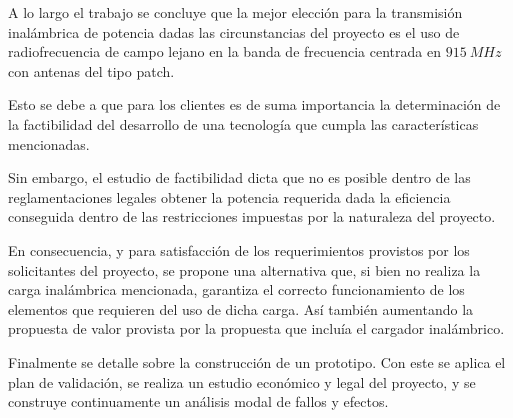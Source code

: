 A lo largo el trabajo se concluye que la mejor elección para la transmisión inalámbrica de potencia dadas las circunstancias del proyecto es el uso de radiofrecuencia de campo lejano en la banda de frecuencia centrada en $915 \ MHz$ con antenas del tipo patch.

Esto se debe a que para los clientes es de suma importancia la determinación de la factibilidad del desarrollo de una tecnología que cumpla las características mencionadas.

Sin embargo, el estudio de factibilidad dicta que no es posible dentro de las reglamentaciones legales obtener la potencia requerida dada la eficiencia conseguida dentro de las restricciones impuestas por la naturaleza del proyecto.

En consecuencia, y para satisfacción de los requerimientos provistos por los solicitantes del proyecto, se propone una alternativa que, si bien no realiza la carga inalámbrica mencionada, garantiza el correcto funcionamiento de los elementos que requieren del uso de dicha carga.
Así también aumentando la propuesta de valor provista por la propuesta que incluía el cargador inalámbrico.

Finalmente se detalle sobre la construcción de un prototipo. Con este se aplica el plan de validación, se realiza un estudio económico y legal del proyecto, y se construye continuamente un análisis modal de fallos y efectos.

%